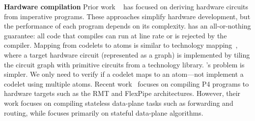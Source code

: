 \textbf{Hardware compilation}
Prior work ~\cite{nurvadathi, cash, bluespec} has focused on deriving hardware
circuits from imperative programs. These approaches simplify hardware
development, but the performance of each program depends on its complexity.
\pktlanguage has an all-or-nothing guarantee: all code that compiles can run at
line rate or is rejected by the compiler.  Mapping from codelets to atoms is
similar to technology mapping~\cite{micheli, flowmap, spectransform}, where a
target hardware circuit (represented as a graph) is implemented by tiling the
circuit graph with primitive circuits from a technology library. \pktlanguage's
problem is simpler. We only need to verify if a codelet maps to an atom---not
implement a codelet using multiple atoms.  Recent work~\cite{lavanya_compiler}
focuses on compiling P4 programs to hardware targets such as the RMT and
FlexPipe architectures. However, their work focuses on compiling stateless
data-plane tasks such as forwarding and routing, while \pktlanguage focuses
primarily on stateful data-plane algorithms.
